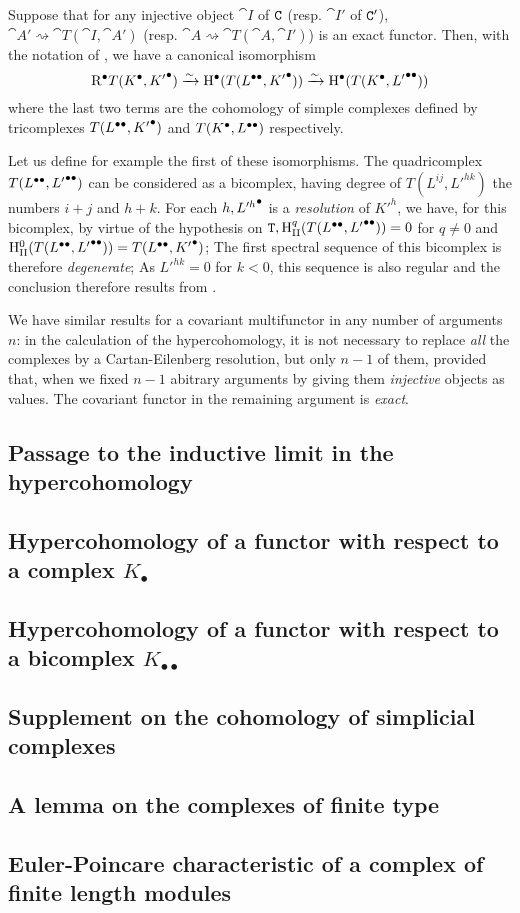 \begin{proposition}[11.4.7]
\label{0.11.4.7}
Suppose that for any injective object $\cat{I}$ of $\mathtt{C}$ (resp. $\cat{I'}$ of $\mathtt{C}'$), $\cat{A'}\rightsquigarrow \cat{T}(\cat{I}, \cat{A'})$ (resp. $\cat{A}\rightsquigarrow \cat{T}(\cat{A}, \cat{I'})$)
is an exact functor. Then, with the notation of , we have a canonical isomorphism
\[
  {\mathrm{R}}^{\bullet}T({K}^{\bullet}, {K'}^{\bullet}) \xrightarrow{\sim} {\mathrm{H}}^{\bullet}(T({L}^{\bullet\bullet}, {K'}^{\bullet})) \xrightarrow{\sim} {\mathrm{H}}^{\bullet}(T({K}^{\bullet}, {L'}^{\bullet\bullet})) 
\]
where the last two terms are the cohomology of simple complexes defined by tricomplexes $T({L}^{\bullet\bullet}, {K'}^{\bullet})$ and $T({K}^{\bullet}, {L}^{\bullet\bullet})$ respectively.
\end{proposition}

Let us define for example the first of these isomorphisms. The quadricomplex $T({L}^{\bullet\bullet}, {L'}^{\bullet\bullet})$ can be considered as a bicomplex, having degree of $T(L^{ij}, L'^{hk})$ the numbers $i+j$ and $h+k$.
For each $h, {L'^h}^{\bullet}$ is a \emph{resolution} of $K'^h$, we have, for this bicomplex, by virtue of the hypothesis on $\mathtt{T}, \mathrm{H}_\text{II}^q(T({L}^{\bullet\bullet}, {L'}^{\bullet\bullet}))=0$ for $q\neq 0$ and $\mathrm{H}_\text{II}^0(T({L}^{\bullet\bullet}, {L'}^{\bullet\bullet})) = T({L}^{\bullet\bullet}, {K'}^{\bullet})$; 
The first spectral sequence of this bicomplex is therefore \emph{degenerate}; As $L'^{hk}=0$ for $k<0$, this sequence is also regular  and the conclusion therefore results from .

We have similar results for a covariant multifunctor in any number of arguments $n$: in the calculation of the hypercohomology, it is not necessary to replace \emph{all} the complexes 
by a Cartan-Eilenberg resolution, but only $n-1$ of them, provided that, when we fixed $n-1$ abitrary arguments by giving them \emph{injective} objects as values.
The covariant functor in the remaining argument is \emph{exact}.


\subsection{Passage to the inductive limit in the hypercohomology}
\label{subsection:0.11.5}

\subsection{Hypercohomology of a functor with respect to a complex $K_{\bullet}$}
\label{subsection:0.11.6}

\subsection{Hypercohomology of a functor with respect to a bicomplex $K_{\bullet\bullet}$}
\label{subsection:0.11.7}

\subsection{Supplement on the cohomology of simplicial complexes}
\label{subsection:0.11.8}

\subsection{A lemma on the complexes of finite type}
\label{subsection:0.11.9}

\subsection{Euler-Poincare characteristic of a complex of finite length modules}
\label{subsection:0.11.10}